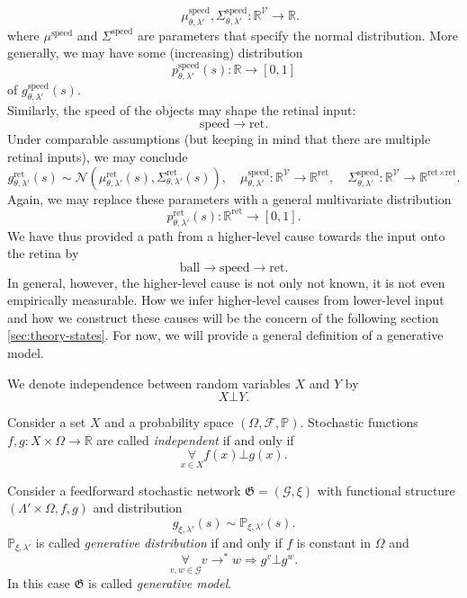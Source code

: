 \documentclass[a4paper,11pt]{report}
\begin{document}
\begin{Par}
\[\quad
\mu^{\text{speed}}_{\theta,\lambda'},\Sigma^{\text{speed}}_{\theta,\lambda'}:\mathbb{R}^{\mathcal{V}}\to\mathbb{R}.
\]
where $\mu^{\text{speed}}$ and $\Sigma^{\text{speed}}$ are parameters that specify the normal distribution. More generally, we may have some (increasing) distribution
\[
p^{\text{speed}}_{\theta,\lambda'}(s):\mathbb{R}\to [0,1]
\]
of $g^{\text{speed}}_{\theta,\lambda'}(s)$.\\
Similarly, the speed of the objects may shape the retinal input:
\[
\text{speed}\to\text{ret}.
\]
Under comparable assumptions (but keeping in mind that there are multiple retinal inputs), we may conclude
\[
g^{\text{ret}}_{\theta,\lambda'}(s)\sim\mathcal{N}\left(\mu^{\text{ret}}_{\theta,\lambda'}(s),\Sigma^{\text{ret}}_{\theta,\lambda'}(s)\right),
\quad
\mu^{\text{speed}}_{\theta,\lambda'}:\mathbb{R}^{\mathcal{V}}\to\mathbb{R}^{\text{ret}},
\quad
\Sigma^{\text{speed}}_{\theta,\lambda'}:\mathbb{R}^{\mathcal{V}}\to\mathbb{R}^{\text{ret}\times\text{ret}}.
\]
Again, we may replace these parameters with a general multivariate distribution
\[
p^{\text{ret}}_{\theta,\lambda'}(s):\mathbb{R}^{\text{ret}}\to[0,1].
\]
We have thus provided a path from a higher-level cause towards the input onto the retina by
\[
\text{ball}\to\text{speed}\to\text{ret}.
\]
In general, however, the higher-level cause is not only not known, it is not even empirically measurable. How we infer higher-level causes from lower-level input and how we construct these causes will be the concern of the following section \ref{sec:theory-states}. For now, we will provide a general definition of a generative model.
\end{Par}

\begin{Not}
We denote independence between random variables $X$ and $Y$ by
\[
X\bot Y.
\]
\end{Not}

\begin{Def}
Consider a set $X$ and a probability space $(\Omega,\mathcal{F},\mathbb{P})$. Stochastic functions $f,g:X\times\Omega\to\mathbb{R}$ are called \emph{independent} if and only if
\[
\underset{x\in X}{\forall}f(x)\bot g(x).
\]
\end{Def}

\begin{Def}\label{def:generative-model}
Consider a feedforward stochastic network $\mathfrak{G}=\left(\mathcal{G},\xi\right)$ with functional structure $(\Lambda'\times\Omega,f,g)$ and distribution
\[
g_{\xi,\lambda'}(s)\sim\mathbb{P}_{\xi,\lambda'}(s).
\]
$\mathbb{P}_{\xi,\lambda'}$ is called \emph{generative distribution} if and only if $f$ is constant in $\Omega$ and
\[
\underset{v,w\in\mathcal{G}}{\forall}v\to^* w\Rightarrow g^v\bot g^w.
\]
In this case $\mathfrak{G}$ is called \emph{generative model}.
\end{Def}
\end{document}
